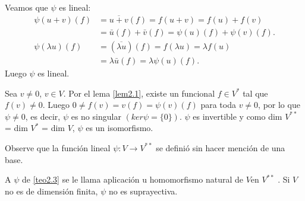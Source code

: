 		\begin{demo}
			\normalfont
			 Veamos que $\psi$ es lineal:
			\begin{align*}
			\psi(u + v)(f ) &= \overline{u+v}(f ) = f (u + v) = f (u) + f (v) \\ &= \bar{u}(f ) + \bar{v}(f ) = \psi(u)(f ) + \psi(v)(f ). \\ \psi(\lambda u)(f ) &= (\overline{\lambda u})(f) = f(\lambda u) = \lambda f(u) \\ &=\lambda\bar{u}(f) = \lambda \psi(u)(f).
			\end{align*}
			Luego $\psi$ es lineal.
			
			Sea $ v \not = 0 $, $ v \in V  $. Por el lema \ref{lem2.1}, existe un funcional $ f \in V^{*} $ tal que $ f (v) \not = 0 $. Luego $ 0 \not = f (v) = v(f ) = \psi(v)(f ) $ para toda $ v \not = 0 $, por lo que $ \psi \not= 0 $, es decir, $\psi$ es no singular $ (ker \psi = \{0\}) $. $\psi$ es invertible y como dim $ V ^{**}$ = dim $ V ^{*}$ = dim $ V  $, $\psi$ es un isomorfismo.
			
			Observe que la función lineal $ \psi: V \longrightarrow V^{**} $ se definió sin hacer mención de una base.
			
			A $\psi$ de \ref{teo2.3} se le llama aplicación u homomorfismo natural de $ V  $en $ V^{**} $ . Si $ V $ no es de dimensión finita, $\psi$ no es suprayectiva.
		\end{demo}
		